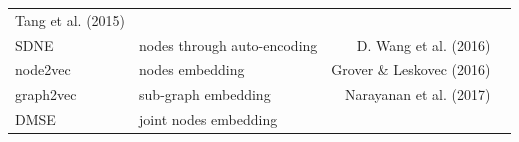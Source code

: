 \documentclass[10pt,oneside]{article}
\begin{document}
\begin{longtable}[]{@{}llrr@{}}
\begin{minipage}[t]{0.16\columnwidth}
Tang et al. (2015)\strut
\end{minipage} & \begin{minipage}[t]{0.32\columnwidth}\raggedleft
\strut
\end{minipage}\tabularnewline
\begin{minipage}[t]{0.11\columnwidth}\raggedright
SDNE\strut
\end{minipage} & \begin{minipage}[t]{0.30\columnwidth}\raggedright
nodes through auto-encoding\strut
\end{minipage} & \begin{minipage}[t]{0.16\columnwidth}\raggedleft
D. Wang et al. (2016)\strut
\end{minipage} & \begin{minipage}[t]{0.32\columnwidth}\raggedleft
\strut
\end{minipage}\tabularnewline
\begin{minipage}[t]{0.11\columnwidth}\raggedright
node2vec\strut
\end{minipage} & \begin{minipage}[t]{0.30\columnwidth}\raggedright
nodes embedding\strut
\end{minipage} & \begin{minipage}[t]{0.16\columnwidth}\raggedleft
Grover \& Leskovec (2016)\strut
\end{minipage} & \begin{minipage}[t]{0.32\columnwidth}\raggedleft
\strut
\end{minipage}\tabularnewline
\begin{minipage}[t]{0.11\columnwidth}\raggedright
graph2vec\strut
\end{minipage} & \begin{minipage}[t]{0.30\columnwidth}\raggedright
sub-graph embedding\strut
\end{minipage} & \begin{minipage}[t]{0.16\columnwidth}\raggedleft
Narayanan et al. (2017)\strut
\end{minipage} & \begin{minipage}[t]{0.32\columnwidth}\raggedleft
\strut
\end{minipage}\tabularnewline
\begin{minipage}[t]{0.11\columnwidth}\raggedright
DMSE\strut
\end{minipage} & \begin{minipage}[t]{0.30\columnwidth}\raggedright
joint nodes embedding\strut
\end{minipage} & \begin{minipage}[t]{0.16\columnwidth}\raggedleft

\end{minipage}
\end{longtable}
\end{document}
